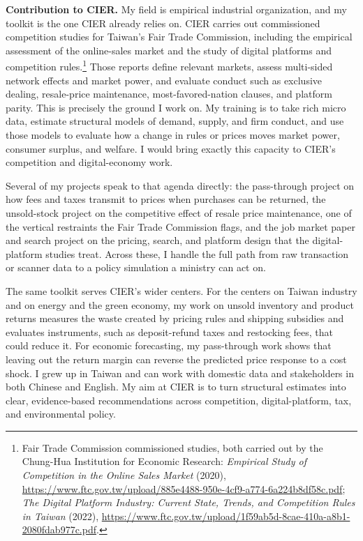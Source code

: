 \documentclass[11pt,letterpaper]{article}
\begin{document}
\medskip
\noindent\textbf{Contribution to CIER.} My field is empirical industrial organization, and my toolkit is the one CIER already relies on. CIER carries out commissioned competition studies for Taiwan's Fair Trade Commission, including the empirical assessment of the online-sales market and the study of digital platforms and competition rules.\footnote{Fair Trade Commission commissioned studies, both carried out by the Chung-Hua Institution for Economic Research: \emph{Empirical Study of Competition in the Online Sales Market} (2020), \url{https://www.ftc.gov.tw/upload/885e4488-950e-4cf9-a774-6a224b8df58c.pdf}; \emph{The Digital Platform Industry: Current State, Trends, and Competition Rules in Taiwan} (2022), \url{https://www.ftc.gov.tw/upload/1f59ab5d-8cae-410a-a8b1-2080fdab977c.pdf}.} Those reports define relevant markets, assess multi-sided network effects and market power, and evaluate conduct such as exclusive dealing, resale-price maintenance, most-favored-nation clauses, and platform parity. This is precisely the ground I work on. My training is to take rich micro data, estimate structural models of demand, supply, and firm conduct, and use those models to evaluate how a change in rules or prices moves market power, consumer surplus, and welfare. I would bring exactly this capacity to CIER's competition and digital-economy work.

Several of my projects speak to that agenda directly: the pass-through project on how fees and taxes transmit to prices when purchases can be returned, the unsold-stock project on the competitive effect of resale price maintenance, one of the vertical restraints the Fair Trade Commission flags, and the job market paper and search project on the pricing, search, and platform design that the digital-platform studies treat. Across these, I handle the full path from raw transaction or scanner data to a policy simulation a ministry can act on.

The same toolkit serves CIER's wider centers. For the centers on Taiwan industry and on energy and the green economy, my work on unsold inventory and product returns measures the waste created by pricing rules and shipping subsidies and evaluates instruments, such as deposit-refund taxes and restocking fees, that could reduce it. For economic forecasting, my pass-through work shows that leaving out the return margin can reverse the predicted price response to a cost shock. I grew up in Taiwan and can work with domestic data and stakeholders in both Chinese and English. My aim at CIER is to turn structural estimates into clear, evidence-based recommendations across competition, digital-platform, tax, and environmental policy.
\end{document}
